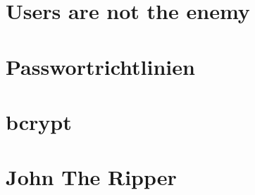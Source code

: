 
\def \Uebungsblatt {01}


	
 
	\section{Users are not the enemy}
	
	\section{Passwortrichtlinien}
	
	\section{bcrypt}
	\section{John The Ripper}
	

